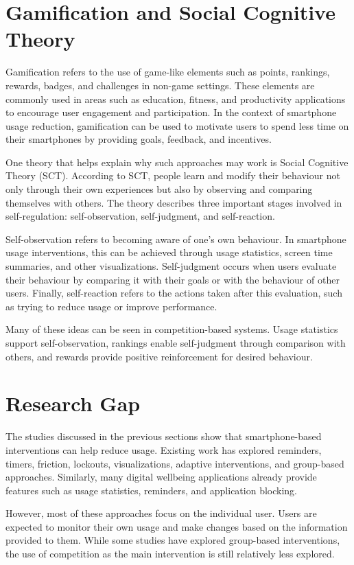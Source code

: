 \documentclass[11pt]{report}
\begin{document}
\section{Gamification and Social Cognitive Theory}
Gamification refers to the use of game-like elements such as points, rankings, 
rewards, badges, and challenges in non-game settings. These elements are commonly used in areas such as education, 
fitness, and productivity applications to encourage user engagement and participation.
In the context of smartphone usage reduction, gamification can be used to motivate users 
to spend less time on their smartphones by providing goals, feedback, and incentives.


One theory that helps explain why such approaches may work is Social Cognitive Theory 
(SCT). According to SCT, people learn and modify their behaviour not only through their 
own experiences but also by observing and comparing themselves with others. The theory 
describes three important stages involved in self-regulation: self-observation, 
self-judgment, and self-reaction.

Self-observation refers to becoming aware of one's own behaviour. In smartphone usage 
interventions, this can be achieved through usage statistics, screen time summaries, and 
other visualizations. Self-judgment occurs when users evaluate their behaviour by 
comparing it with their goals or with the behaviour of other users. Finally, 
self-reaction refers to the actions taken after this evaluation, such as trying to reduce 
usage or improve performance.

Many of these ideas can be seen in competition-based systems. Usage statistics support 
self-observation, rankings enable self-judgment through comparison with others, and 
rewards provide positive reinforcement for desired behaviour.

\section{Research Gap}

The studies discussed in the previous sections show that smartphone-based interventions 
can help reduce usage. Existing work has explored reminders, timers, friction, lockouts, 
visualizations, adaptive interventions, and group-based approaches. Similarly, 
many digital wellbeing applications already provide features such as usage statistics, 
reminders, and application blocking.

However, most of these approaches focus on the individual user. Users are expected to 
monitor their own usage and make changes based on the information provided to them. 
While some studies have explored group-based interventions, the use of competition as 
the main intervention is still relatively less explored.
\end{document}
